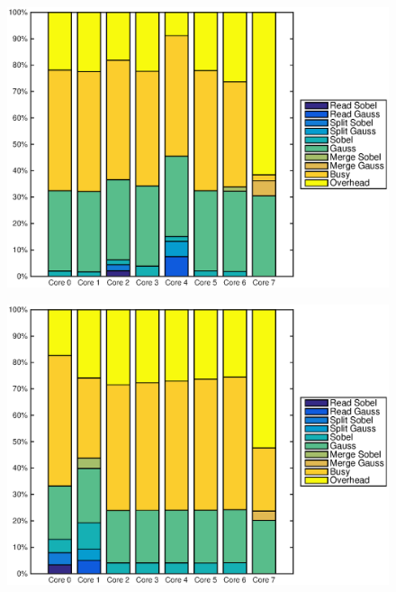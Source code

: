 \begin{figure}
    \centering
    \begin{minipage}{0.45\textwidth}
        \centering
        \includegraphics[width=0.99\linewidth]{images/preesm_sobelcif_gauss4cif.eps}
        \label{fig:preesmgauss4cif}
    \end{minipage}
    \hfill
    \begin{minipage}{0.45\textwidth}
        \centering
        \includegraphics[width=0.99\linewidth]{images/preesm_sobelqcif_gaussqcif.eps}
        \label{fig:preesmgauss4cif}
    \end{minipage}%
\end{figure}
